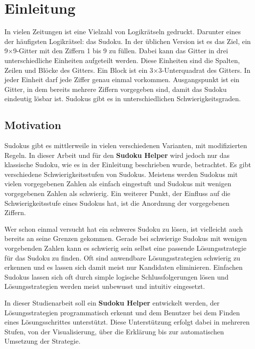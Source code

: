 
\chapter{Einleitung}
In vielen Zeitungen ist eine Vielzahl von Logikrätseln gedruckt. Darunter eines der häufigsten Logikrätsel: das Sudoku.
In der üblichen Version ist es das Ziel, ein 9×9-Gitter mit den Ziffern 1 bis 9 zu füllen. Dabei kann das Gitter in drei unterschiedliche Einheiten aufgeteilt werden. Diese Einheiten sind die Spalten, Zeilen und Blöcke des Gitters. Ein Block ist ein 3×3-Unterquadrat des Gitters. In jeder Einheit darf jede Ziffer genau einmal vorkommen.
Ausgangspunkt ist ein Gitter, in dem bereits mehrere Ziffern vorgegeben sind, damit das Sudoku eindeutig lösbar ist. Sudokus gibt es in unterschiedlichen Schwierigkeitsgraden. 
 

\section{Motivation}
Sudokus gibt es mittlerweile in vielen verschiedenen Varianten, mit modifizierten Regeln. In dieser Arbeit und für den \textbf{Sudoku Helper} wird jedoch nur das klassische Sudoku, wie es in der Einleitung beschrieben wurde, betrachtet. Es gibt verschiedene Schwierigkeitsstufen von Sudokus. Meistens werden Sudokus mit vielen vorgegebenen Zahlen als einfach eingestuft und Sudokus mit wenigen vorgegebenen Zahlen als schwierig. Ein weiterer Punkt, der Einfluss auf die Schwierigkeitsstufe eines Sudokus hat, ist die Anordnung der vorgegebenen Ziffern.

Wer schon einmal versucht hat ein schweres Sudoku  zu lösen, ist vielleicht auch bereits an seine Grenzen gekommen. Gerade bei schwierige Sudokus mit wenigen vorgebenden Zahlen kann es schwierig sein selbst eine passende Lösungsstrategie für das Sudoku zu finden. Oft sind anwendbare Lösungsstrategien schwierig zu erkennen und es lassen sich damit meist nur Kandidaten eliminieren. Einfachen Sudokus lassen sich oft durch simple logische Schlussfolgerungen lösen und Lösungsstrategien werden meist unbewusst und intuitiv eingesetzt. 

In dieser Studienarbeit soll ein \textbf{Sudoku Helper} entwickelt werden, der Lösungsstrategien programmatisch erkennt und dem Benutzer bei dem Finden eines Lösungsschrittes unterstützt. Diese Unterstützung erfolgt dabei in mehreren Stufen, von der Visualisierung, über die Erklärung bis zur automatischen Umsetzung der Strategie.


